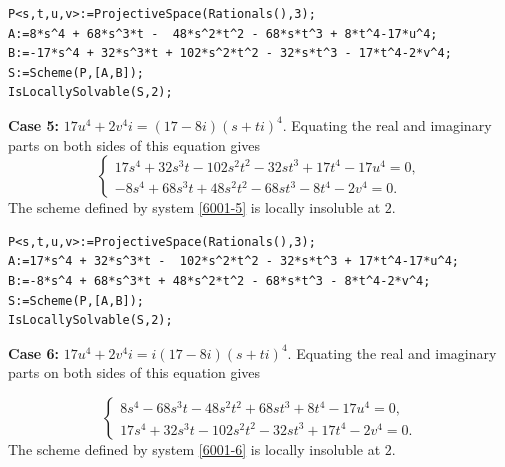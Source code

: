 \documentclass[a4paper,12pt,english,reqno]{amsart}
\begin{document}
\begin{lstlisting}
P<s,t,u,v>:=ProjectiveSpace(Rationals(),3);
A:=8*s^4 + 68*s^3*t -  48*s^2*t^2 - 68*s*t^3 + 8*t^4-17*u^4;
B:=-17*s^4 + 32*s^3*t + 102*s^2*t^2 - 32*s*t^3 - 17*t^4-2*v^4;
S:=Scheme(P,[A,B]);
IsLocallySolvable(S,2);
\end{lstlisting}

{\bf Case 5:} $17u^4+2v^4i=(17-8i)(s+ti)^4$. Equating the real and imaginary parts on both sides of this equation gives
\begin{equation}\label{6001-5}
\begin{cases}
17s^4 + 32s^3t - 102s^2t^2 - 32st^3 + 17t^4 - 17u^4=0,\\
-8s^4 + 68s^3t + 48s^2t^2 - 68st^3 - 8t^4 - 2v^4=0.
\end{cases}
\end{equation}
The scheme defined by system \eqref{6001-5} is locally insoluble at $2$.

\begin{lstlisting}
P<s,t,u,v>:=ProjectiveSpace(Rationals(),3);
A:=17*s^4 + 32*s^3*t -  102*s^2*t^2 - 32*s*t^3 + 17*t^4-17*u^4;
B:=-8*s^4 + 68*s^3*t + 48*s^2*t^2 - 68*s*t^3 - 8*t^4-2*v^4;
S:=Scheme(P,[A,B]);
IsLocallySolvable(S,2);
\end{lstlisting}


{\bf Case 6:} $17u^4+2v^4i=i(17-8i)(s+ti)^4$. Equating the real and imaginary parts on both sides of this equation gives

\begin{equation}\label{6001-6}
\begin{cases}
8s^4 - 68s^3t - 48s^2t^2 + 68st^3 + 8t^4 - 17u^4=0,\\
17s^4 + 32s^3t - 102s^2t^2 - 32st^3 + 17t^4 - 2v^4=0.
\end{cases}
\end{equation}
The scheme defined by system \eqref{6001-6} is locally insoluble at $2$.
\end{document}

